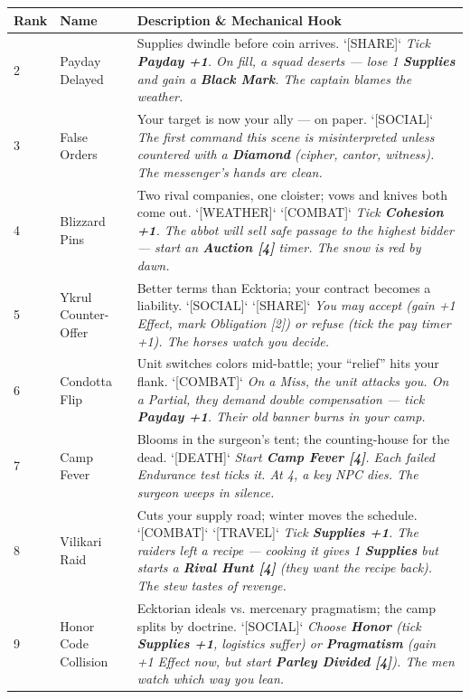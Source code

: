 \begin{longtable}{|p{}|p{}|p{}|}
\hline
\textbf{Rank} & \textbf{Name} & \textbf{Description \& Mechanical Hook} \\
\hline
2 & Payday Delayed & Supplies dwindle before coin arrives. `[SHARE]` \textit{Tick \textbf{Payday +1}. On fill, a squad deserts --- lose 1 \textbf{Supplies} and gain a \textbf{Black Mark}. The captain blames the weather.} \\
\hline
3 & False Orders & Your target is now your ally --- on paper. `[SOCIAL]` \textit{The first command this scene is misinterpreted unless countered with a \textbf{Diamond} (cipher, cantor, witness). The messenger's hands are clean.} \\
\hline
4 & Blizzard Pins & Two rival companies, one cloister; vows and knives both come out. `[WEATHER]` `[COMBAT]` \textit{Tick \textbf{Cohesion +1}. The abbot will sell safe passage to the highest bidder --- start an \textbf{Auction [4]} timer. The snow is red by dawn.} \\
\hline
5 & Ykrul Counter-Offer & Better terms than Ecktoria; your contract becomes a liability. `[SOCIAL]` `[SHARE]` \textit{You may accept (gain +1 Effect, mark Obligation [2]) or refuse (tick the pay timer +1). The horses watch you decide.} \\
\hline
6 & Condotta Flip & Unit switches colors mid-battle; your ``relief'' hits your flank. `[COMBAT]` \textit{On a Miss, the unit attacks you. On a Partial, they demand double compensation --- tick \textbf{Payday +1}. Their old banner burns in your camp.} \\
\hline
7 & Camp Fever & Blooms in the surgeon's tent; the counting-house for the dead. `[DEATH]` \textit{Start \textbf{Camp Fever [4]}. Each failed Endurance test ticks it. At 4, a key NPC dies. The surgeon weeps in silence.} \\
\hline
8 & Vilikari Raid & Cuts your supply road; winter moves the schedule. `[COMBAT]` `[TRAVEL]` \textit{Tick \textbf{Supplies +1}. The raiders left a recipe --- cooking it gives 1 \textbf{Supplies} but starts a \textbf{Rival Hunt [4]} (they want the recipe back). The stew tastes of revenge.} \\
\hline
9 & Honor Code Collision & Ecktorian ideals vs. mercenary pragmatism; the camp splits by doctrine. `[SOCIAL]` \textit{Choose \textbf{Honor} (tick \textbf{Supplies +1}, logistics suffer) or \textbf{Pragmatism} (gain +1 Effect now, but start \textbf{Parley Divided [4]}). The men watch which way you lean.} \\

\end{longtable}
